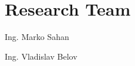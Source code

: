 \section{Research Team}\label{sec:research_team}
\begin{description}
	\item Ing. Marko Sahan
	\item Ing. Vladislav Belov
\end{description}
